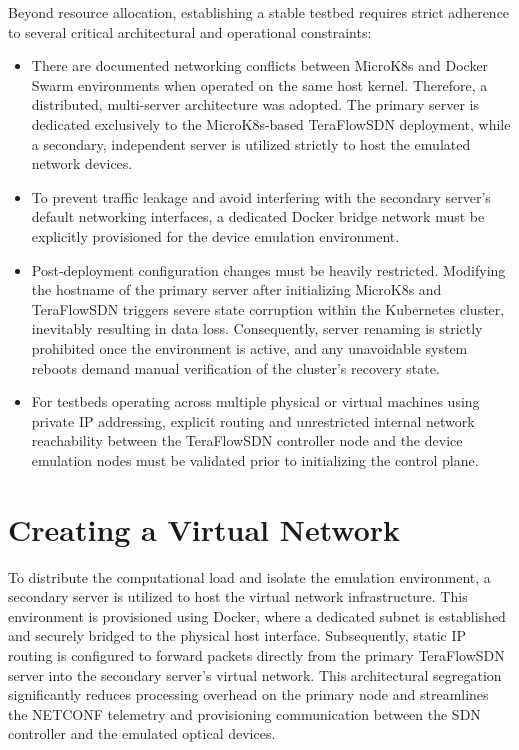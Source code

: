 Beyond resource allocation, establishing a stable testbed requires strict adherence to several critical architectural and operational constraints:
\begin{itemize}
    \item There are documented networking conflicts between MicroK8s and Docker Swarm environments when operated on the same host kernel. Therefore, a distributed, multi-server architecture was adopted. The primary server is dedicated exclusively to the MicroK8s-based TeraFlowSDN deployment, while a secondary, independent server is utilized strictly to host the emulated network devices.
    \item To prevent traffic leakage and avoid interfering with the secondary server's default networking interfaces, a dedicated Docker bridge network must be explicitly provisioned for the device emulation environment.
    \item Post-deployment configuration changes must be heavily restricted. Modifying the hostname of the primary server after initializing MicroK8s and TeraFlowSDN triggers severe state corruption within the Kubernetes cluster, inevitably resulting in data loss. Consequently, server renaming is strictly prohibited once the environment is active, and any unavoidable system reboots demand manual verification of the cluster's recovery state.
    \item For testbeds operating across multiple physical or virtual machines using private IP addressing, explicit routing and unrestricted internal network reachability between the TeraFlowSDN controller node and the device emulation nodes must be validated prior to initializing the control plane.
\end{itemize}
\section{Creating a Virtual Network}
To distribute the computational load and isolate the emulation environment, a secondary server is utilized to host the virtual network infrastructure. This environment is provisioned using Docker, where a dedicated subnet is established and securely bridged to the physical host interface. Subsequently, static IP routing is configured to forward packets directly from the primary TeraFlowSDN server into the secondary server's virtual network. This architectural segregation significantly reduces processing overhead on the primary node and streamlines the NETCONF telemetry and provisioning communication between the SDN controller and the emulated optical devices.


